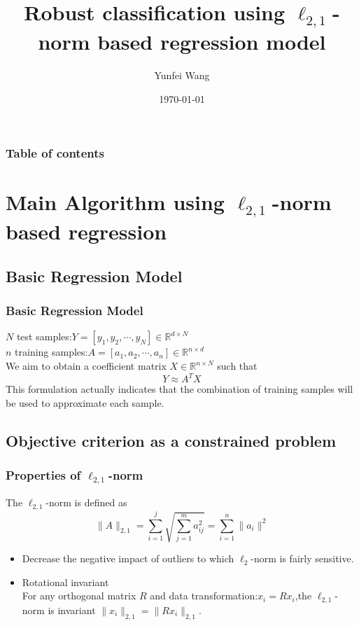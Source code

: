 \documentclass{beamer}
\title{Robust classification using $\ell_{2,1}$-norm based regression model}
\author{Yunfei Wang}
\institute{Department of Computer Science \& Technology \\ Huazhong University of Science \& Technology}
\date{\today}
\begin{document}
\begin{frame}
\titlepage
\end{frame}


\begin{frame}\frametitle{Table of contents}
\tableofcontents
\end{frame}


\section{Main Algorithm using $\ell_{2,1}$-norm based regression}
\subsection{Basic Regression Model}
\begin{frame}\frametitle{Basic Regression Model}
$N$ test samples:$Y=[y_1,y_2,\cdots ,y_N]\in \mathbb{R}^{d \times N}$\\
$n$ training samples:$A=[a_1,a_2,\cdots ,a_n]\in \mathbb{R}^{n \times d}$\\
We aim to obtain a coefficient matrix $X\in \mathbb{R}^{n \times N}$ such that
\begin{displaymath}
Y \approx A^TX
\end{displaymath}
This formulation actually indicates that the combination of training samples will be used to approximate each sample.
\end{frame}

\subsection{Objective criterion as a constrained problem}
\begin{frame}\frametitle{Properties of $\ell_{2,1}$-norm}
The $\ell_{2,1}$-norm is defined as
\begin{displaymath}
\|A\|_{2,1}=\sum_{i=1}^j\sqrt{\sum_{j=1}^m a_{ij}^2}=\sum_{i=1}^n\|a_i\|^2
\end{displaymath}
\begin{itemize}
\item Decrease the negative impact of outliers to which $\ell_2$-norm is fairly sensitive.
\item Rotational invariant\\
For any orthogonal matrix $R$ and data transformation:$x_i=R x_i$,the $\ell_{2,1}$-norm is invariant $\|x_i\|_{2,1}=\|R x_i\|_{2,1}$.
\end{itemize}
\end{frame}
\end{document}
